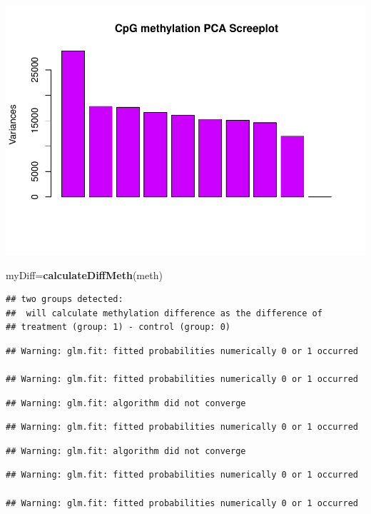 \documentclass[]{article}
\newenvironment{Shaded}{\begin{snugshade}}{\end{snugshade}}
\newcommand{\KeywordTok}[1]{\textcolor[rgb]{0.13,0.29,0.53}{\textbf{#1}}}
\newcommand{\NormalTok}[1]{#1}
\begin{document}
\includegraphics{mk-02_files/figure-latex/unnamed-chunk-11-1.pdf}

\begin{Shaded}
\begin{Highlighting}[]
\NormalTok{myDiff=}\KeywordTok{calculateDiffMeth}\NormalTok{(meth)}
\end{Highlighting}
\end{Shaded}

\begin{verbatim}
## two groups detected:
##  will calculate methylation difference as the difference of
## treatment (group: 1) - control (group: 0)
\end{verbatim}

\begin{verbatim}
## Warning: glm.fit: fitted probabilities numerically 0 or 1 occurred

## Warning: glm.fit: fitted probabilities numerically 0 or 1 occurred
\end{verbatim}

\begin{verbatim}
## Warning: glm.fit: algorithm did not converge
\end{verbatim}

\begin{verbatim}
## Warning: glm.fit: fitted probabilities numerically 0 or 1 occurred
\end{verbatim}

\begin{verbatim}
## Warning: glm.fit: algorithm did not converge
\end{verbatim}

\begin{verbatim}
## Warning: glm.fit: fitted probabilities numerically 0 or 1 occurred

## Warning: glm.fit: fitted probabilities numerically 0 or 1 occurred
\end{verbatim}
\end{document}
